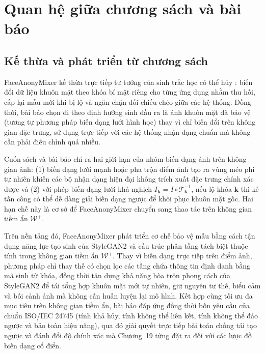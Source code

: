 \documentclass[oneside,a4paper,12pt]{extarticle}
\begin{document}
\section{Quan hệ giữa chương sách và bài báo}
\label{sec:tc3}

\subsection{Kế thừa và phát triển từ chương sách}
\label{sec:tc3-ke-thua}
FaceAnonyMixer \cite{alam2025} kế thừa trực tiếp tư tưởng của sinh trắc học có thể hủy \cite{adler2008, ratha2001}: biến đổi dữ liệu khuôn mặt theo khóa bí mật riêng cho từng ứng dụng nhằm thu hồi, cấp lại mẫu mới khi bị lộ và ngăn chặn đối chiếu chéo giữa các hệ thống. Đồng thời, bài báo chọn đi theo định hướng sinh đầu ra là ảnh khuôn mặt đã bảo vệ (tương tự phương pháp biến dạng lưới hình học) thay vì chỉ biến đổi trên không gian đặc trưng, sử dụng trực tiếp với các hệ thống nhận dạng chuẩn mà không cần phải điều chỉnh quá nhiều.

Cuốn sách và bài báo chỉ ra hai giới hạn của nhóm biến dạng ảnh trên không gian ảnh: (1) biến dạng lưới mạnh hoặc pha trộn điểm ảnh tạo ra vùng méo phi tự nhiên khiến các bộ nhận dạng hiện đại không trích xuất đặc trưng chính xác được và (2) với phép biến dạng lưới khả nghịch $I_{\mathbf{k}} = I \circ \mathcal{T}_{\mathbf{k}}^{-1}$, nếu lộ khóa $\mathbf{k}$ thì kẻ tấn công có thể dễ dàng giải biến dạng ngược để khôi phục khuôn mặt gốc. Hai hạn chế này là cơ sở để FaceAnonyMixer chuyển sang thao tác trên không gian tiềm ẩn $\mathcal{W}^+$.

Trên nền tảng đó, FaceAnonyMixer phát triển cơ chế bảo vệ mẫu bằng cách tận dụng năng lực tạo sinh của StyleGAN2 và cấu trúc phân tầng tách biệt thuộc tính trong không gian tiềm ẩn $\mathcal{W}^+$. Thay vì biến dạng trực tiếp trên điểm ảnh, phương pháp chỉ thay thế có chọn lọc các tầng chứa thông tin định danh bằng mã sinh từ khóa, đồng thời tận dụng khả năng hòa trộn phong cách của StyleGAN2 để tái tổng hợp khuôn mặt mới tự nhiên, giữ nguyên tư thế, biểu cảm và bối cảnh ảnh mà không cần huấn luyện lại mô hình. Kết hợp cùng tối ưu đa mục tiêu trên không gian tiềm ẩn, bài báo đáp ứng đồng thời bốn yêu cầu của chuẩn ISO/IEC 24745 (tính khả hủy, tính không thể liên kết, tính không thể đảo ngược và bảo toàn hiệu năng), qua đó giải quyết trực tiếp bài toán chống tái tạo ngược và đánh đổi độ chính xác mà Chương~19 từng đặt ra đối với các lược đồ biến dạng cổ điển.
\end{document}
